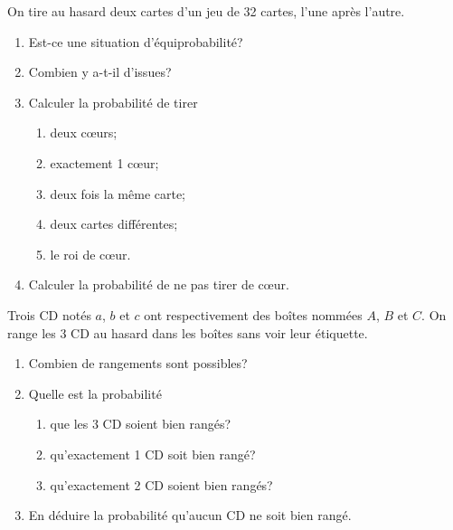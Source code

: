 \begin{exercice}
On tire au hasard deux cartes d'un jeu de 32 cartes, l'une après l'autre.
	\begin{enumerate}
		\item Est-ce une situation d'équiprobabilité?
		\item Combien y a-t-il d'issues?
		
		\item Calculer la probabilité de tirer
		\begin{enumerate}
		\item deux c\oe urs;
			\item  exactement 1 c\oe ur;
			\item  deux fois la même carte;
			\item  deux cartes différentes;
			\item  le roi de c\oe ur.
		\end{enumerate}	
		\item  Calculer la probabilité de ne pas tirer de c\oe ur.
	\end{enumerate}
\end{exercice}

\begin{exercice}
Trois CD notés $a$, $b$ et $c$ ont respectivement des boîtes nommées $A$, $B$ et $C$.
On range les 3 CD au hasard dans les boîtes sans voir leur étiquette.
\begin{enumerate}
\item Combien de rangements sont possibles?
\item Quelle est la probabilité 
\begin{enumerate}
\item que les 3 CD soient bien rangés?
\item qu'exactement 1 CD soit bien rangé?
\item qu'exactement 2 CD soient bien rangés?
\end{enumerate}
\item En déduire la probabilité qu'aucun CD ne soit bien rangé.
\end{enumerate}
\end{exercice}






